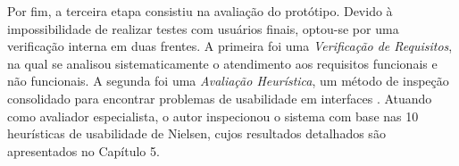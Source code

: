 Por fim, a terceira etapa consistiu na avaliação do protótipo. Devido à impossibilidade de realizar testes com usuários finais, optou-se por uma verificação interna em duas frentes. A primeira foi uma \textit{Verificação de Requisitos}, na qual se analisou sistematicamente o atendimento aos requisitos funcionais e não funcionais. A segunda foi uma \textit{Avaliação Heurística}, um método de inspeção consolidado para encontrar problemas de usabilidade em interfaces \cite{Nielsen1994}. Atuando como avaliador especialista, o autor inspecionou o sistema com base nas 10 heurísticas de usabilidade de Nielsen, cujos resultados detalhados são apresentados no Capítulo 5.